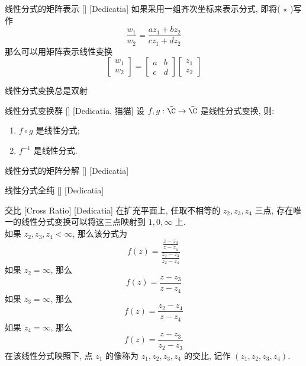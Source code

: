 \documentclass[UTF8]{ctexart}
\begin{document}
        \begin{ppt}
            [UUID]
            {线性分式的矩阵表示}
            []
            [Dedicatia]
            如果采用一组齐次坐标来表示分式, 即将( \(\star\) )写作
            \[\frac{w_1}{w_2}=\frac{az_1+bz_2}{cz_1+dz_2}\]
            那么可以用矩阵表示线性变换
            \[
            \begin{bmatrix}
                w_1 \\ w_2
            \end{bmatrix}
            =
            \begin{bmatrix}
                a & b \\ c & d
            \end{bmatrix}
            \begin{bmatrix}
                z_1 \\ z_2
            \end{bmatrix}
            \]
        \end{ppt}
        
        \begin{ppt}
            {线性分式变换总是双射}
        \end{ppt}
        
        \begin{ppt}
            []
            {线性分式变换群}
            []
            [Dedicatia, 猫猫]
            设 \(f, g:\bar{\C}\to\bar{\C}\) 是线性分式变换, 则: 
            \begin{enumerate}
                \item \(f\circ g\) 是线性分式; 
                \item \(f^{-1}\) 是线性分式. 
            \end{enumerate}
        \end{ppt}

        \begin{ppt}
            [UUID]
            {线性分式的矩阵分解}
            []
            [Dedicatia]
        \end{ppt}

        \begin{ppt}
            [UUID]
            {线性分式全纯}
            []
            [Dedicatia]
        \end{ppt}
        
        \begin{dfn}
            [UUID]
            {交比}
            [Cross Ratio]
            [Dedicatia]
            在扩充平面上, 任取不相等的 \(z_2,z_3,z_4\) 三点, 存在唯一的线性分式变换可以将这三点映射到 \(1,0,\infty\) 上. \\
            如果 \(z_2,z_3,z_4<\infty\), 那么该分式为
            \[f(z)=\frac{\frac{z-z_3}{z-z_4}}{\frac{z_2-z_3}{z_2-z_4}}\]
            如果 \(z_2=\infty\), 那么
            \[f(z)=\frac{z-z_3}{z-z_4}\]
            如果 \(z_3=\infty\), 那么
            \[f(z)=\frac{z_2-z_4}{z-z_4}\]
            如果 \(z_4=\infty\), 那么
            \[f(z)=\frac{z-z_3}{z_2-z_3}\]
            在该线性分式映照下, 点 \(z_1\) 的像称为 \(z_1,z_2,z_3,z_4\) 的交比, 记作 \((z_1,z_2,z_3,z_4)\).
        \end{dfn}
\end{document}
